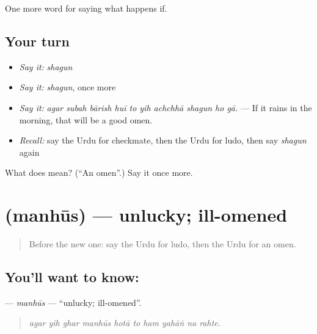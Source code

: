 \begin{grammarlens}[title={What you've built}]
One more word for saying what happens if.
\end{grammarlens}

\subsection*{Your turn}
\begin{itemize}
\raggedright
  \item \emph{Say it:} \emph{shagun}
  \item \emph{Say it:} \emph{shagun}, once more
  \item \emph{Say it:} \emph{agar subah bārish huī to yih achchhā shagun ho gā.} — If it rains in the morning, that will be a good omen.
  \item \emph{Recall:} say the Urdu for checkmate, then the Urdu for ludo, then say \emph{shagun} again
\end{itemize}

\begin{tcolorbox}[breakable,colback=teal!4,colframe=teal!35!black,title={Before you move on}]
What does  mean? (\textquotedblleft{}An omen\textquotedblright{}.) Say it once more.
\end{tcolorbox}
\section[\texorpdfstring{\ur{منحوس} (manhūs)}{منحوس (manhūs)}]{ (manhūs) — unlucky; ill-omened}

\label{lesson:UR-C535-manhus}



\begin{quote}
Before the new one: say the Urdu for ludo, then the Urdu for an omen.
\end{quote}

\subsection*{You'll want to know: }
\textbf{} — \emph{manhūs} — \textquotedblleft{}unlucky; ill-omened\textquotedblright{}.

\begin{quote}
         
\end{quote}

\begin{quote}
\emph{agar yih ghar manhūs hotā to ham yahāṅ na rahte.}
\end{quote}

